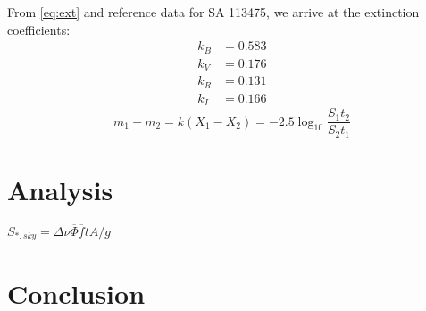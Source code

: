 \documentclass{article}
\newcommand{\obar}[1]{\ensuremath{\overline{ #1 }}}
\begin{document}
From \ref{eq:ext} and reference data for SA 113475, we arrive at the extinction coefficients:
\begin{align*}
k_B&= 0.583\\
k_V&= 0.176\\
k_R&= 0.131\\
k_I&= 0.166
\end{align*}
\begin{equation}
\label{eq:ext}
m_1-m_2=k(X_1-X_2)=-2.5\log_{10}\frac{S_1t_2}{S_2t_1}
\end{equation}
\section{Analysis}
$S_{*,sky}=\Delta\nu{\obar{\Phi}}{\obar{f}}tA/g$





\section{Conclusion}






\begin{thebibliography}{9}

\end{thebibliography}
\end{document}
